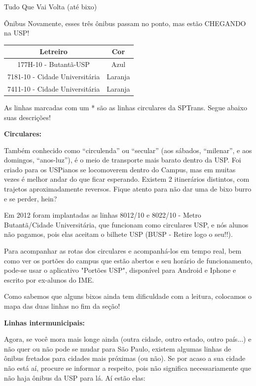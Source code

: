 \begin{secao}{Tudo Que Vai Volta (até bixo)}
\begin{subsecao}{Ônibus}
Novamente, esses três ônibus passam no ponto, mas estão CHEGANDO na USP!
\begin{center}
	\begin{tabular}{|c|c|}
	  \hline
	  Letreiro & Cor\\
	  \hline
	  177H-10 - Butantã-USP & Azul\\
	  7181-10 - Cidade Universitária & Laranja\\
	  7411-10 - Cidade Universitária & Laranja\\
	  \hline
	\end{tabular}
\end{center}

As linhas marcadas com um * são as linhas circulares da SPTrans. Segue abaixo suas descrições!

{\bf Circulares:}

Também conhecido como ``circulenda'' ou ``secular'' (aos sábados, ``milenar'', e aos domingos, ``anos-luz''), é o meio de transporte mais barato dentro da USP. Foi criado para os USPianos se locomoverem dentro do Campus, mas em muitas vezes é melhor andar do que ficar esperando. Existem 2 itinerários distintos, com trajetos aproximadamente reversos. Fique atento para não dar uma de bixo burro e se perder, hein? 

Em 2012 foram implantadas as linhas 8012/10 e 8022/10 - Metro Butantã/Cidade Universitária,
que funcionam como circulares USP, e nós alunos não pagamos, pois elas aceitam o bilhete USP (BUSP - Retire logo o seu!!).

Para acompanhar as rotas dos circulares e acompanhá-los em tempo real, bem como
ver os portões do campus que estão abertos e seu horário de funcionamento, pode-se
usar o aplicativo "Portões USP", disponível para Android e Iphone e escrito por ex-alunos
do IME.

Como sabemos que alguns bixos ainda tem dificuldade com a leitura, colocamos o
 mapa das duas linhas no fim da seção!


{\bf Linhas intermunicipais:}

Agora, se você mora mais longe ainda (outra cidade, outro estado, outro país...) e não quer ou não pode se mudar para São Paulo, existem algumas linhas de ônibus fretados para cidades mais próximas (ou não). Se por acaso a sua cidade não está aí, procure se informar a respeito, pois não significa necessariamente que não haja ônibus da USP para lá. Aí estão elas:


\end{subsecao}
\end{secao}
